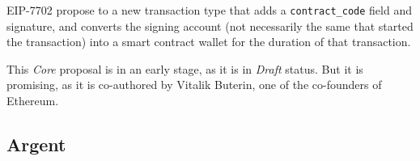 EIP-7702 propose to a new transaction type that adds a \texttt{contract\_code} field and signature, and converts the signing account (not necessarily the same that started the transaction) into a smart contract wallet for the duration of that transaction. \cite{eip-7702}

This \textit{Core} proposal is in an early stage, as it is in \textit{Draft} status. But it is promising, as it is co-authored by Vitalik Buterin, one of the co-founders of Ethereum.

\subsection{Argent}
\label{subsec:argent}
